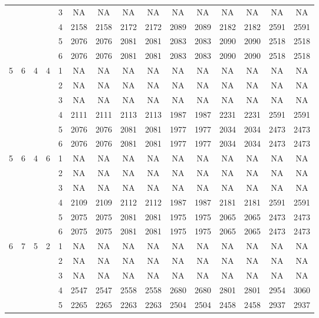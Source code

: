 \begin{longtable}{|c|c|c|c|c|c c|c c|c c|c c|c c|}
 & & & & 3 & NA & NA & NA & NA & NA & NA & NA & NA & NA & NA \\
 & & & & 4 & 2158 & 2158 & 2172 & 2172 & 2089 & 2089 & 2182 & 2182 & 2591 & 2591 \\
 & & & & 5 & 2076 & 2076 & 2081 & 2081 & 2083 & 2083 & 2090 & 2090 & 2518 & 2518 \\
 & & & & 6 & 2076 & 2076 & 2081 & 2081 & 2083 & 2083 & 2090 & 2090 & 2518 & 2518 \\
\hline
\multirow{6}{*}{5} & \multirow{6}{*}{6} & \multirow{6}{*}{4} & \multirow{6}{*}{4} & 1 & NA & NA & NA & NA & NA & NA & NA & NA & NA & NA \\
 & & & & 2 & NA & NA & NA & NA & NA & NA & NA & NA & NA & NA \\
 & & & & 3 & NA & NA & NA & NA & NA & NA & NA & NA & NA & NA \\
 & & & & 4 & 2111 & 2111 & 2113 & 2113 & 1987 & 1987 & 2231 & 2231 & 2591 & 2591 \\
 & & & & 5 & 2076 & 2076 & 2081 & 2081 & 1977 & 1977 & 2034 & 2034 & 2473 & 2473 \\
 & & & & 6 & 2076 & 2076 & 2081 & 2081 & 1977 & 1977 & 2034 & 2034 & 2473 & 2473 \\
\hline
\multirow{6}{*}{5} & \multirow{6}{*}{6} & \multirow{6}{*}{4} & \multirow{6}{*}{6} & 1 & NA & NA & NA & NA & NA & NA & NA & NA & NA & NA \\
 & & & & 2 & NA & NA & NA & NA & NA & NA & NA & NA & NA & NA \\
 & & & & 3 & NA & NA & NA & NA & NA & NA & NA & NA & NA & NA \\
 & & & & 4 & 2109 & 2109 & 2112 & 2112 & 1987 & 1987 & 2181 & 2181 & 2591 & 2591 \\
 & & & & 5 & 2075 & 2075 & 2081 & 2081 & 1975 & 1975 & 2065 & 2065 & 2473 & 2473 \\
 & & & & 6 & 2075 & 2075 & 2081 & 2081 & 1975 & 1975 & 2065 & 2065 & 2473 & 2473 \\
\hline
\multirow{6}{*}{6} & \multirow{6}{*}{7} & \multirow{6}{*}{5} & \multirow{6}{*}{2} & 1 & NA & NA & NA & NA & NA & NA & NA & NA & NA & NA \\
 & & & & 2 & NA & NA & NA & NA & NA & NA & NA & NA & NA & NA \\
 & & & & 3 & NA & NA & NA & NA & NA & NA & NA & NA & NA & NA \\
 & & & & 4 & 2547 & 2547 & 2558 & 2558 & 2680 & 2680 & 2801 & 2801 & 2954 & 3060 \\
 & & & & 5 & 2265 & 2265 & 2263 & 2263 & 2504 & 2504 & 2458 & 2458 & 2937 & 2937 \\

\end{longtable}
